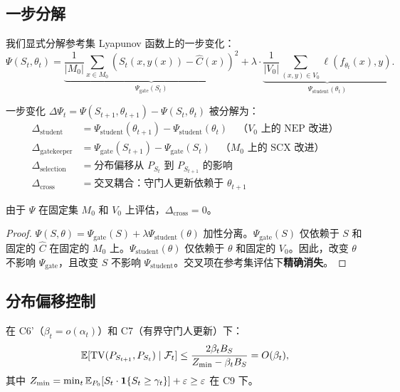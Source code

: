 \subsection{一步分解}\label{sec:decomp}

我们显式分解参考集 Lyapunov 函数上的一步变化：
\begin{equation}\label{eq:lyapunov-full-def}
    \Psi(S_t, \theta_t) = \underbrace{\frac{1}{|M_0|} \sum_{x \in M_0} (S_t(x, y(x)) - \hat{C}(x))^2}_{\Psi_{\text{gate}}(S_t)} + \lambda \cdot \underbrace{\frac{1}{|V_0|} \sum_{(x,y) \in V_0} \ell(f_{\theta_t}(x), y)}_{\Psi_{\text{student}}(\theta_t)}.
\end{equation}

一步变化 $\Delta\Psi_t = \Psi(S_{t+1}, \theta_{t+1}) - \Psi(S_t, \theta_t)$ 被分解为：
\begin{align}
    \Delta_{\text{student}} &= \Psi_{\text{student}}(\theta_{t+1}) - \Psi_{\text{student}}(\theta_t) \quad \text{（$V_0$ 上的 NEP 改进）} \\
    \Delta_{\text{gatekeeper}} &= \Psi_{\text{gate}}(S_{t+1}) - \Psi_{\text{gate}}(S_t) \quad \text{（$M_0$ 上的 SCX 改进）} \\
    \Delta_{\text{selection}} &= \text{分布偏移从 $P_{S_t}$ 到 $P_{S_{t+1}}$ 的影响} \\
    \Delta_{\text{cross}} &= \text{交叉耦合：守门人更新依赖于 $\theta_{t+1}$}
\end{align}

\begin{lemma}[交叉耦合在参考集上消失]\label{lem:cross-zero}
由于 $\Psi$ 在固定集 $M_0$ 和 $V_0$ 上评估，$\Delta_{\text{cross}} = 0$。
\end{lemma}

\begin{proof}
$\Psi(S, \theta) = \Psi_{\text{gate}}(S) + \lambda \Psi_{\text{student}}(\theta)$ 加性分离。$\Psi_{\text{gate}}(S)$ 仅依赖于 $S$ 和固定的 $\hat{C}$ 在固定的 $M_0$ 上。$\Psi_{\text{student}}(\theta)$ 仅依赖于 $\theta$ 和固定的 $V_0$。因此，改变 $\theta$ 不影响 $\Psi_{\text{gate}}$，且改变 $S$ 不影响 $\Psi_{\text{student}}$。交叉项在参考集评估下\textbf{精确消失}。
\end{proof}

\subsection{分布偏移控制}

\begin{lemma}[分布偏移界]\label{lem:tv-bound}
在 C6'（$\beta_t = o(\alpha_t)$）和 C7（有界守门人更新）下：
\begin{equation}
    \mathbb{E}[\operatorname{TV}(P_{S_{t+1}}, P_{S_t}) \mid \mathcal{F}_t] \leq \frac{2\beta_t B_S}{Z_{\min} - \beta_t B_S} = O(\beta_t),
\end{equation}
其中 $Z_{\min} = \min_t \mathbb{E}_{P_0}[S_t \cdot \mathbf{1}\{S_t \geq \gamma_t\}] + \varepsilon \geq \varepsilon$ 在 C9 下。
\end{lemma}

